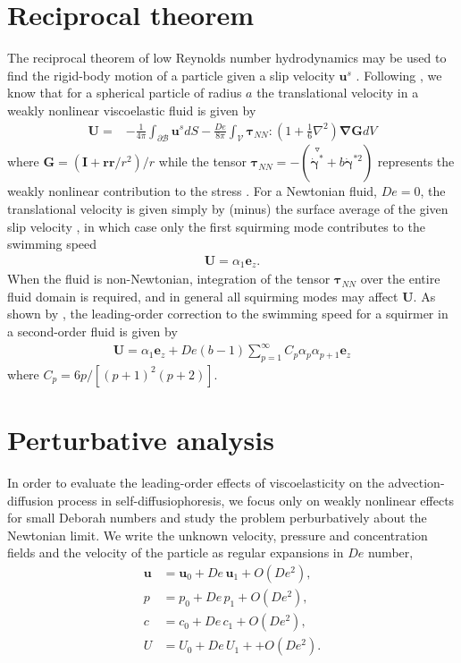\documentclass[aps,pre,reprint,twocolumn,notitlepage,superscriptaddress]{revtex4-1}
\begin{document}
\section{Reciprocal theorem}
The reciprocal theorem of low Reynolds number hydrodynamics \citep{happel65} may be used to find the rigid-body motion of a particle given a slip velocity $\boldsymbol{u}^s$ \citep{stone96,lauga09,lauga14,elfring16}. Following \citet{datt2017active}, we know that for a spherical particle of radius $a$ the translational velocity in a weakly nonlinear viscoelastic fluid is given by
\begin{align}
\boldsymbol{U} = &-\frac{1}{4\pi }\int_{\partial\mathcal{B}}\boldsymbol{u}^s d S - \frac{De}{8\pi}\int_{\mathcal{V}}\boldsymbol{\tau}_{NN} :\left(1+\frac{1}{6}\nabla^2\right)\boldsymbol{\nabla}\boldsymbol{G} d V
\end{align}
where $\boldsymbol{G} = (\boldsymbol{I}+\boldsymbol{r}\boldsymbol{r}/r^2)/r$ while the tensor $\boldsymbol{\tau}_{NN} = -\left(\overset{\triangledown}{\dot{\boldsymbol{\gamma}}^{*}}+b\dot{\boldsymbol{\gamma}}^{*2}\right)$ represents the weakly nonlinear contribution to the stress \cite{elfring17}. For a Newtonian fluid, $De=0$, the translational velocity is given simply by (minus) the surface average of the given slip velocity \cite{stone96,elfring15}, in which case only the first squirming mode contributes to the swimming speed
\begin{align}
\boldsymbol{U} = \alpha_1 \boldsymbol{e}_z.
\end{align}
When the fluid is non-Newtonian, integration of the tensor $\boldsymbol{\tau}_{NN}$ over the entire fluid domain is required, and in general all squirming modes may affect $\boldsymbol{U}$. As shown by \citet{datt2017active}, the leading-order correction to the swimming speed for a squirmer in a second-order fluid is given by
\begin{align}
\boldsymbol{U} = \alpha_1 \boldsymbol{e}_z +De(b-1)\sum_{p=1}^\infty C_p \alpha_p\alpha_{p+1} \boldsymbol{e}_z
\end{align}
where $C_p = 6p/[(p+1)^2(p+2)]$.


\section{Perturbative analysis}
In order to evaluate the leading-order effects of viscoelasticity on the advection-diffusion process in self-diffusiophoresis, we focus only on weakly nonlinear effects for small Deborah numbers and study the problem perburbatively about the Newtonian limit. We write the unknown velocity, pressure and concentration fields and the velocity of the particle as regular expansions in $De$ number,
\begin{align}
\boldsymbol{u}&=\boldsymbol{u}_{0}+De\,\boldsymbol{u}_{1}+O\left(De^{2}\right),\label{uexp}\\
p&=p_{0}+De\,p_{1}+O\left(De^{2}\right),\label{pexp}\\
c&=c_{0}+De\,c_{1}+O\left(De^{2}\right),\label{cexp}\\
U&= U_0+De\,U_1++O\left(De^{2}\right).
\end{align}
\end{document}
